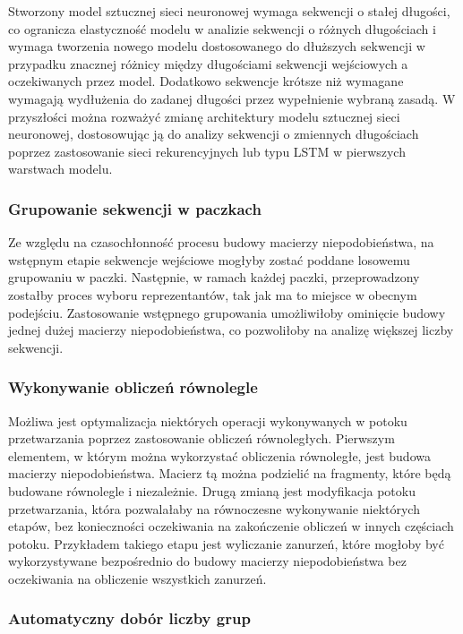             Stworzony model sztucznej sieci neuronowej wymaga sekwencji o stałej długości, co ogranicza elastyczność modelu w analizie sekwencji o różnych długościach i wymaga tworzenia nowego modelu dostosowanego do dłuższych sekwencji w przypadku znacznej różnicy między długościami sekwencji wejściowych a oczekiwanych przez model. Dodatkowo sekwencje krótsze niż wymagane wymagają wydłużenia do zadanej długości przez wypełnienie wybraną zasadą. W przyszłości można rozważyć zmianę architektury modelu sztucznej sieci neuronowej, dostosowując ją do analizy sekwencji o zmiennych długościach poprzez zastosowanie sieci rekurencyjnych lub typu LSTM w pierwszych warstwach modelu.

        \subsubsection{Grupowanie sekwencji w paczkach}

            Ze względu na czasochłonność procesu budowy macierzy niepodobieństwa, na wstęp\-nym etapie sekwencje wejściowe mogłyby zostać poddane losowemu grupowaniu w paczki. Następnie, w ramach każdej paczki, przeprowadzony zostałby proces wyboru reprezentantów, tak jak ma to miejsce w obecnym podejściu. Zastosowanie wstępnego grupowania umożliwiłoby ominięcie budowy jednej dużej macierzy niepodobieństwa, co pozwoliłoby na analizę większej liczby sekwencji.

        \subsubsection{Wykonywanie obliczeń równolegle}

            Możliwa jest optymalizacja niektórych operacji wykonywanych w potoku przetwarzania poprzez zastosowanie obliczeń równoległych. Pierwszym elementem, w którym można wykorzystać obliczenia równoległe, jest budowa macierzy niepodobieństwa. Macierz tą można podzielić na fragmenty, które będą budowane równolegle i niezależnie. Drugą zmianą jest modyfikacja potoku przetwarzania, która pozwalałaby na równoczesne wykonywanie niektórych etapów, bez konieczności oczekiwania na zakończenie obliczeń w innych częściach potoku. Przykładem takiego etapu jest wyliczanie zanurzeń, które mogłoby być wykorzystywane bezpośrednio do budowy macierzy niepodobieństwa bez oczekiwania na obliczenie wszystkich zanurzeń.

        \subsubsection{Automatyczny dobór liczby grup}

